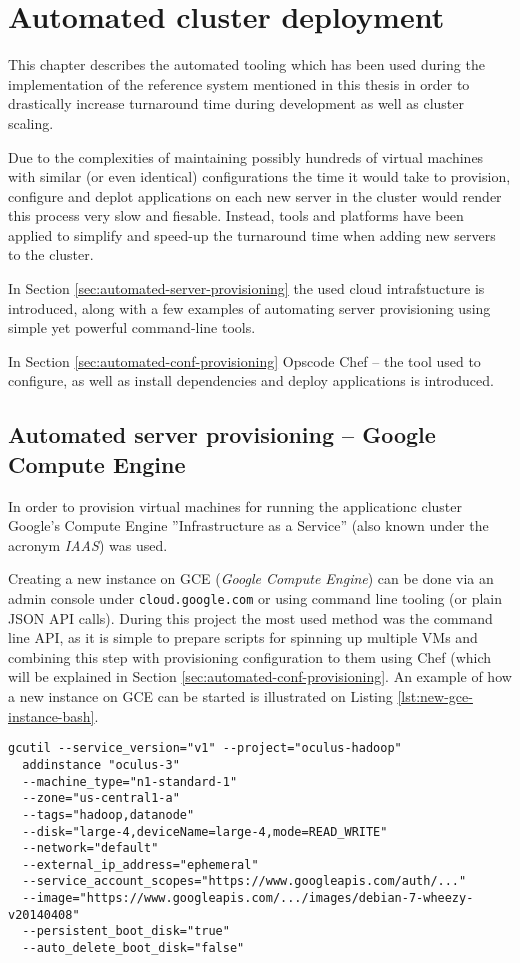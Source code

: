 \chapter{Automated cluster deployment}
\label{app:chef}
This chapter describes the automated tooling which has been used during the implementation of the reference system mentioned in this thesis in order to drastically increase turnaround time during development as well as cluster scaling.

Due to the complexities of maintaining possibly hundreds of virtual machines with similar (or even identical) configurations the time it would take to provision, configure and deplot applications on each new server in the cluster would render this process very slow and fiesable. Instead, tools and platforms have been applied to simplify and speed-up the turnaround time when adding new servers to the cluster. 

In Section \ref{sec:automated-server-provisioning} the used cloud intrafstucture is introduced, along with a few examples of automating server provisioning using simple yet powerful command-line tools. 

In Section \ref{sec:automated-conf-provisioning} Opscode Chef -- the tool used to configure, as well as install dependencies and deploy applications is introduced.

\label{sec:automated-server-provisioning}
\section{Automated server provisioning -- Google Compute Engine}

In order to provision virtual machines for running the applicationc cluster Google's Compute Engine ''Infrastructure as a Service'' (also known under the acronym \textit{IAAS}) was used. 

Creating a new instance on GCE (\textit{Google Compute Engine}) can be done via an admin console under \verb|cloud.google.com| or using command line tooling (or plain JSON API calls). During this project the most used method was the command line API, as it is simple to prepare scripts for spinning up multiple VMs and combining this step with provisioning configuration to them using Chef (which will be explained in Section \ref{sec:automated-conf-provisioning}. An example of how a new instance on GCE can be started is illustrated on Listing \ref{lst:new-gce-instance-bash}.

\begin{lstlisting}[caption={Creating new instance on GCE}, label={lst:new-gce-instance-bash}]
gcutil --service_version="v1" --project="oculus-hadoop" 
  addinstance "oculus-3" 
  --machine_type="n1-standard-1" 
  --zone="us-central1-a" 
  --tags="hadoop,datanode"
  --disk="large-4,deviceName=large-4,mode=READ_WRITE"
  --network="default" 
  --external_ip_address="ephemeral" 
  --service_account_scopes="https://www.googleapis.com/auth/..." 
  --image="https://www.googleapis.com/.../images/debian-7-wheezy-v20140408" 
  --persistent_boot_disk="true" 
  --auto_delete_boot_disk="false"
\end{lstlisting}



